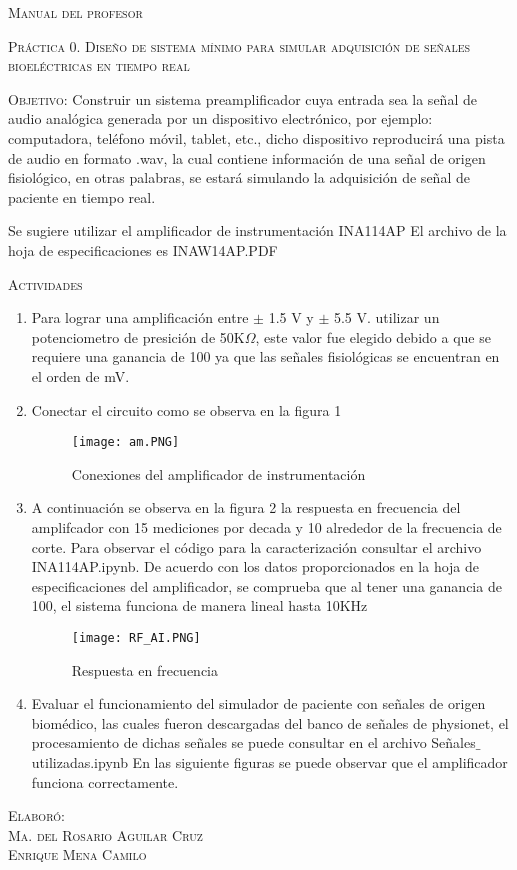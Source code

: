 \documentclass[10pt,letterpaper,spanish,twoside]{report}
\begin{document}
\docdate

\begin{center}
 \textsc{\asignatura}\vspace{.2em}
\end{center}

\textsc{Manual del profesor}

\textsc{Práctica 0. Diseño de sistema mínimo para simular adquisición de señales bioeléctricas en tiempo real}

\textsc{Objetivo:} Construir un sistema preamplificador cuya entrada sea la señal de audio analógica generada por un dispositivo electrónico, por ejemplo: computadora, teléfono móvil, tablet, etc., dicho dispositivo reproducirá una pista de audio en formato .wav, la cual contiene información de una señal de origen fisiológico, en otras palabras, se estará simulando la adquisición de señal de paciente en tiempo real.

Se sugiere utilizar el amplificador de instrumentación INA114AP
\newline El archivo de la hoja de especificaciones es INAW14AP.PDF

\textsc{Actividades}
\begin{enumerate}
 \item Para lograr una amplificación entre $\pm$ 1.5 V y $\pm$ 5.5 V. utilizar un potenciometro de presición de 50K$\Omega$, este valor fue elegido debido a que se requiere una ganancia de 100 ya que las señales fisiológicas se encuentran en el orden de mV.
 \item Conectar el circuito como se observa en la figura 1
 \begin{figure}[h]
 	\centering
 	\texttt{[image: am.PNG]}
 	\caption{Conexiones del amplificador de instrumentación}
	\label{contexto:figura}
 \end{figure}
 \item A continuación se observa en la figura 2 la respuesta en frecuencia del amplifcador con 15 mediciones por decada y 10 alrededor de la frecuencia de corte. Para observar el código para la caracterización consultar el archivo INA114AP.ipynb.
 \newline De acuerdo con los datos proporcionados en la hoja de especificaciones del amplificador, se comprueba que al tener una ganancia de 100, el sistema funciona de manera lineal hasta 10KHz
 \begin{figure}[h]
 	\centering
 	\texttt{[image: RF\_AI.PNG]}
 	\caption{Respuesta en frecuencia}
	\label{contexto:figura}
 \end{figure}
 \item Evaluar el funcionamiento del simulador de paciente con señales de origen biomédico, las cuales fueron descargadas del banco de señales de physionet, el procesamiento de dichas señales se puede consultar en el archivo Señales$\_$utilizadas.ipynb 
 \newline En las siguiente figuras se puede observar que el amplificador funciona correctamente.	
\end{enumerate}


\vfill
\begin{flushright}
\textsc{Elaboró:\\
Ma. del Rosario Aguilar Cruz\\
Enrique Mena Camilo}
\end{flushright}
\end{document}

